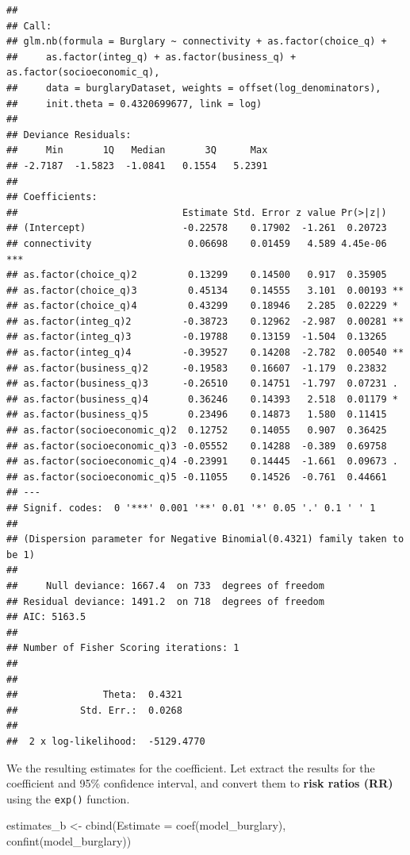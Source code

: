 \documentclass[
]{book}
\newenvironment{Shaded}{\begin{snugshade}}{\end{snugshade}}
\newcommand{\AttributeTok}[1]{\textcolor[rgb]{0.77,0.63,0.00}{#1}}
\newcommand{\FunctionTok}[1]{\textcolor[rgb]{0.00,0.00,0.00}{#1}}
\newcommand{\NormalTok}[1]{#1}
\newcommand{\OtherTok}[1]{\textcolor[rgb]{0.56,0.35,0.01}{#1}}
\begin{document}
\begin{verbatim}
## 
## Call:
## glm.nb(formula = Burglary ~ connectivity + as.factor(choice_q) + 
##     as.factor(integ_q) + as.factor(business_q) + as.factor(socioeconomic_q), 
##     data = burglaryDataset, weights = offset(log_denominators), 
##     init.theta = 0.4320699677, link = log)
## 
## Deviance Residuals: 
##     Min       1Q   Median       3Q      Max  
## -2.7187  -1.5823  -1.0841   0.1554   5.2391  
## 
## Coefficients:
##                             Estimate Std. Error z value Pr(>|z|)    
## (Intercept)                 -0.22578    0.17902  -1.261  0.20723    
## connectivity                 0.06698    0.01459   4.589 4.45e-06 ***
## as.factor(choice_q)2         0.13299    0.14500   0.917  0.35905    
## as.factor(choice_q)3         0.45134    0.14555   3.101  0.00193 ** 
## as.factor(choice_q)4         0.43299    0.18946   2.285  0.02229 *  
## as.factor(integ_q)2         -0.38723    0.12962  -2.987  0.00281 ** 
## as.factor(integ_q)3         -0.19788    0.13159  -1.504  0.13265    
## as.factor(integ_q)4         -0.39527    0.14208  -2.782  0.00540 ** 
## as.factor(business_q)2      -0.19583    0.16607  -1.179  0.23832    
## as.factor(business_q)3      -0.26510    0.14751  -1.797  0.07231 .  
## as.factor(business_q)4       0.36246    0.14393   2.518  0.01179 *  
## as.factor(business_q)5       0.23496    0.14873   1.580  0.11415    
## as.factor(socioeconomic_q)2  0.12752    0.14055   0.907  0.36425    
## as.factor(socioeconomic_q)3 -0.05552    0.14288  -0.389  0.69758    
## as.factor(socioeconomic_q)4 -0.23991    0.14445  -1.661  0.09673 .  
## as.factor(socioeconomic_q)5 -0.11055    0.14526  -0.761  0.44661    
## ---
## Signif. codes:  0 '***' 0.001 '**' 0.01 '*' 0.05 '.' 0.1 ' ' 1
## 
## (Dispersion parameter for Negative Binomial(0.4321) family taken to be 1)
## 
##     Null deviance: 1667.4  on 733  degrees of freedom
## Residual deviance: 1491.2  on 718  degrees of freedom
## AIC: 5163.5
## 
## Number of Fisher Scoring iterations: 1
## 
## 
##               Theta:  0.4321 
##           Std. Err.:  0.0268 
## 
##  2 x log-likelihood:  -5129.4770
\end{verbatim}

We the resulting estimates for the coefficient. Let extract the results for the coefficient and 95\% confidence interval, and convert them to \textbf{risk ratios (RR)} using the \texttt{exp()} function.

\begin{Shaded}
\begin{Highlighting}[]
\NormalTok{estimates\_b }\OtherTok{\textless{}{-}} \FunctionTok{cbind}\NormalTok{(}\AttributeTok{Estimate =} \FunctionTok{coef}\NormalTok{(model\_burglary), }\FunctionTok{confint}\NormalTok{(model\_burglary))}
\end{Highlighting}
\end{Shaded}
\end{document}
